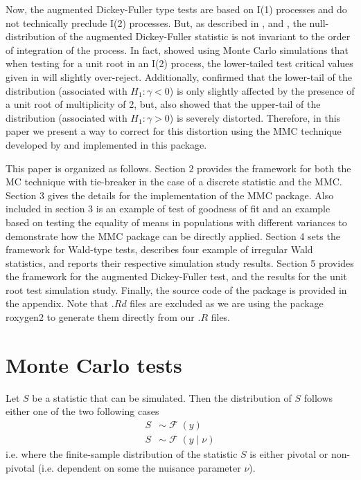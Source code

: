 \documentclass[11pt]{article}\usepackage[]{graphicx}\usepackage[]{color}
\newcommand{\pkg}[1]{{\normalfont\fontseries{b}\selectfont #1}}
\DeclareMathOperator{\dist}{\mathcal{F}}
\begin{document}
Now, the augmented Dickey-Fuller type tests are based on I(1) processes and do not technically preclude I(2) processes. But, as described in \cite{david_a._dickey_determining_1987}, \cite{haldrup_robustness_2002} and \cite{pantula_testing_1989}, the null-distribution of the augmented Dickey-Fuller statistic is not invariant to the order of integration of the process. In fact, \cite{david_a._dickey_determining_1987} showed using Monte Carlo simulations that when testing for a unit root in an I(2) process, the lower-tailed test critical values given in \cite[Table 8.5.2]{fuller_introduction_1976} will slightly over-reject. Additionally,  \cite{haldrup_robustness_2002} confirmed that the lower-tail of the distribution (associated with $H_1: \gamma<0$) is only slightly affected by the presence of a unit root of multiplicity of 2, but, \cite{haldrup_robustness_2002} also showed that the upper-tail of the distribution (associated with $H_1: \gamma>0$) is severely distorted. Therefore, in this paper we present a way to correct for this distortion using the MMC technique developed by \cite{dufour_monte_2006} and implemented in this package.

This paper is organized as follows. Section 2 provides the framework for both the MC technique with tie-breaker in the case of a discrete statistic and the MMC. Section 3 gives the details for the implementation of the \pkg{MMC} package. Also included in section 3 is an example of test of goodness of fit and an example based on testing the equality of means in populations with different variances to demonstrate how the \pkg{MMC} package can be directly applied. Section 4 sets the framework for Wald-type tests, describes four example of irregular Wald statistics, and reports their respective simulation study results. Section 5 provides the framework for the augmented Dickey-Fuller test, and the results for the unit root test simulation study. Finally, the source code of the package is provided in the appendix. Note that $.Rd$ files are excluded as we are using the package \pkg{roxygen2} \citep{wickham_roxygen2:_2015} to generate them directly from our $.R$ files.

\section{Monte Carlo tests}

Let $S$ be a statistic that can be simulated. Then the distribution of $S$ follows either one of the two following cases
\begin{align}
S & \sim \dist(y) \\
S & \sim \dist(y \mid \nu)
\end{align}
i.e. where the finite-sample distribution of the statistic $S$ is either pivotal or non-pivotal (i.e. dependent on some the nuisance parameter $\nu$).
\end{document}
